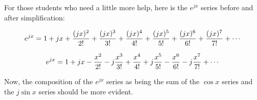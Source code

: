 
For those students who need a little more help, here is the $e^{jx}$ series before and after simplification:

$$e^{jx} = 1 + jx + {(jx)^2 \over 2!} + {(jx)^3 \over 3!} + {(jx)^4 \over 4!} + {(jx)^5 \over 5!} + {(jx)^6 \over 6!} + {(jx)^7 \over 7!} + \cdots $$

$$e^{jx} = 1 + jx - {x^2 \over 2!} - j{x^3 \over 3!} + {x^4 \over 4!} + j{x^5 \over 5!} - {x^6 \over 6!} - j{x^7 \over 7!} + \cdots $$

Now, the composition of the $e^{jx}$ series as being the sum of the $\cos x$ series and the $j \sin x$ series should be more evident.




